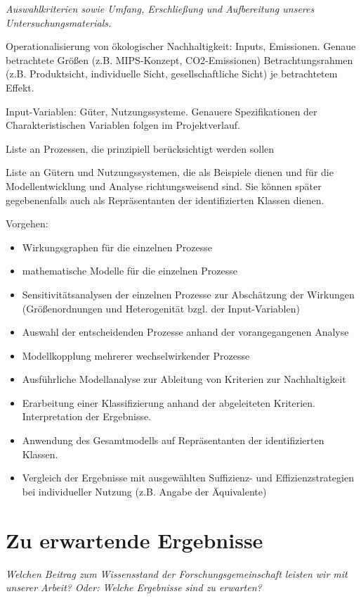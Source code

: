 \documentclass[11pt, titlepage=true]{scrartcl} %
\newcommand{\was}[1]{\small\textit{#1}}
\begin{document}
\was{Auswahlkriterien sowie Umfang, Erschließung und Aufbereitung unseres
Untersuchungsmaterials.}

Operationalisierung von ökologischer Nachhaltigkeit: Inputs, Emissionen. Genaue betrachtete Größen (z.B. MIPS-Konzept, CO2-Emissionen) Betrachtungsrahmen (z.B. Produktsicht, individuelle Sicht, gesellschaftliche Sicht) je betrachtetem Effekt. 

Input-Variablen: Güter, Nutzungssysteme. Genauere Spezifikationen der Charakteristischen Variablen folgen im Projektverlauf.

Liste an Prozessen, die prinzipiell berücksichtigt werden sollen

Liste an Gütern und Nutzungssystemen, die als Beispiele dienen und für die Modellentwicklung und Analyse richtungsweisend sind. Sie können später gegebenenfalls auch als Repräsentanten der identifizierten Klassen dienen.

Vorgehen:
\begin{itemize}
	\item Wirkungsgraphen für die einzelnen Prozesse
	\item mathematische Modelle für die einzelnen Prozesse
	\item Sensitivitätsanalysen der einzelnen Prozesse zur Abschätzung der Wirkungen (Größenordnungen und Heterogenität bzgl. der Input-Variablen)
	\item Auswahl der entscheidenden Prozesse anhand der vorangegangenen Analyse
	\item Modellkopplung mehrerer wechselwirkender Prozesse
	\item Ausführliche Modellanalyse zur Ableitung von Kriterien zur Nachhaltigkeit
	\item Erarbeitung einer Klassifizierung anhand der abgeleiteten Kriterien. Interpretation der Ergebnisse.
	\item Anwendung des Gesamtmodells auf Repräsentanten der identifizierten Klassen.
	\item Vergleich der Ergebnisse mit ausgewählten Suffizienz- und Effizienzstrategien bei individueller Nutzung (z.B. Angabe der Äquivalente)
\end{itemize}


\section{Zu erwartende Ergebnisse}
\was{Welchen Beitrag zum Wissensstand der Forschungsgemeinschaft leisten wir mit
unserer Arbeit?
Oder: Welche Ergebnisse sind zu erwarten?}
\end{document}
